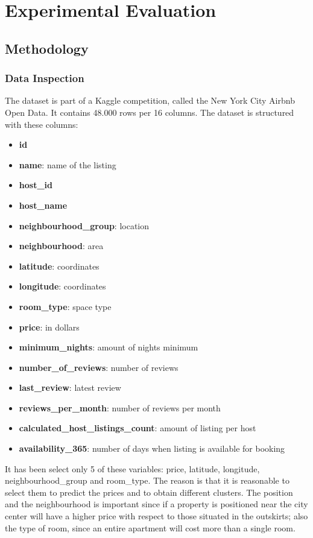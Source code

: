 \documentclass{FR16}
\begin{document}
\newpage
\section{Experimental Evaluation}

\subsection{Methodology}
\subsubsection{Data Inspection}
The dataset is part of a Kaggle competition, called the New York City Airbnb Open Data. It contains 48.000 rows per 16 columns.
The dataset is structured with these columns: 
\begin{itemize}
\itemsep0em 
\item \textbf{id}
\item \textbf{name}: name of the listing
\item \textbf{host\_id}
\item \textbf{host\_name}
\item \textbf{neighbourhood\_group}: location
\item \textbf{neighbourhood}: area
\item \textbf{latitude}: coordinates
\item \textbf{longitude}: coordinates
\item \textbf{room\_type}: space type
\item \textbf{price}:  in dollars
\item \textbf{minimum\_nights}: amount of nights minimum
\item \textbf{number\_of\_reviews}: number of reviews
\item \textbf{last\_review}: latest review
\item \textbf{reviews\_per\_month}: number of reviews per month
\item \textbf{calculated\_host\_listings\_count}: amount of listing per host
\item  \textbf{availability\_365}: number of days when listing is available for booking\\
\end{itemize}
It has been select only 5 of these variables: price, latitude, longitude, neighbourhood\_group and room\_type. The reason is that it is reasonable to select them to predict the prices and to obtain different clusters. The position and the neighbourhood is important since if a property is positioned near the city center will have a higher price with respect to those situated in the outskirts; also the type of room, since an entire apartment will cost more than a single room. \\\\
\end{document}
